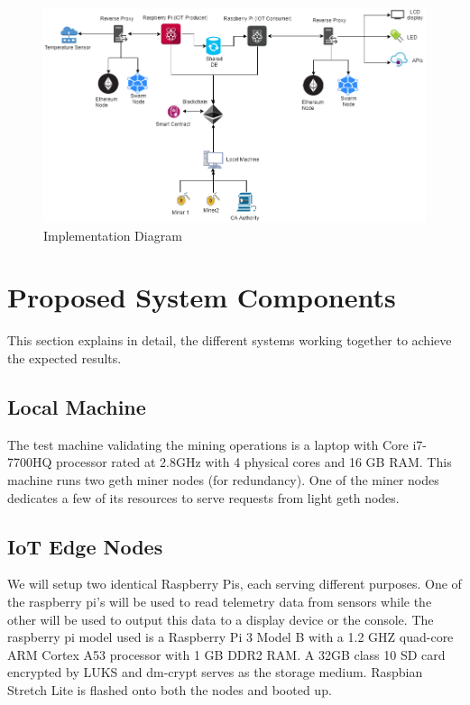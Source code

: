 \documentclass[11pt,openright]{report}
\begin{document}
\begin{figure}
	\centering
	\includegraphics[scale=0.5]{images/Final_Implementation.png}
	\caption{Implementation Diagram}
	\label{fig:impldiagram_architechture}
\end{figure}


\section{Proposed System Components}
This section explains in detail, the different systems working together to achieve the expected results.

\subsection{Local Machine}
The test machine validating the mining operations is a laptop with Core i7-7700HQ processor rated at 2.8GHz with 4 physical cores and 16 GB RAM. This machine runs two geth miner nodes (for redundancy). One of the miner nodes dedicates a few of its resources to serve requests from light geth nodes.

\subsection{IoT Edge Nodes}
We will setup two identical Raspberry Pis, each serving different purposes. One of the raspberry pi's will be used to read telemetry data from sensors while the other will be used to output this data to a display device or the console.
The raspberry pi model used is a Raspberry Pi 3 Model B with a 1.2 GHZ quad-core ARM Cortex A53 processor with 1 GB DDR2 RAM. A 32GB class 10 SD card encrypted by LUKS and dm-crypt serves as the storage medium. Raspbian Stretch Lite is flashed onto both the nodes and booted up.
\end{document}
